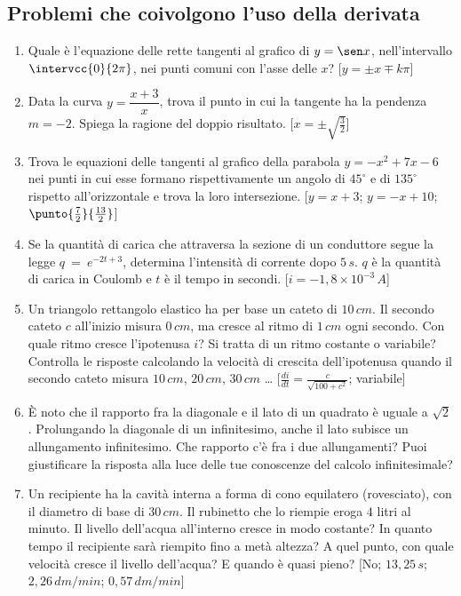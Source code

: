 \subsection{Problemi che coivolgono l'uso della derivata}
\begin{enumerate}
\item Quale è l'equazione delle rette tangenti al grafico di \(y=\sen x\), 
nell'intervallo \(\intervcc{0}{2\pi}\), nei punti comuni con l'asse delle \(x\)?
 \hfill[\(y=\pm x\mp k\pi\)]

\item Data la curva \(y=\dfrac{x+3}{x}\), trova il punto in cui la tangente ha 
la pendenza \(m=-2\). Spiega la ragione del doppio risultato.
\hfill [\(x=\pm\sqrt{\frac{3}{2}}\)]

\item  Trova le equazioni delle tangenti al grafico della parabola 
\(y=-x^2+7x-6\) nei punti in cui esse formano rispettivamente un angolo di 
\(45^\circ\) e di \(135^\circ\) rispetto all'orizzontale e trova la loro 
intersezione.
 \hfill [\(y=x+3\); \(y=-x+10\); \(\punto{\frac{7}{2}}{\frac{13}{2}}\)]

\item Se la quantità di carica che attraversa la sezione di un conduttore
segue la legge \(q~=~e^{-2t+3}\),  determina 
l'intensità di corrente dopo \(5\,s\).
\(q\) è la quantità di carica in Coulomb e \(t\) è il tempo in secondi.
\hfill [\(i=-1,8\times 10^{-3}\, A\)]

\item Un triangolo rettangolo elastico ha per base un cateto di \(10\, cm\).
Il secondo cateto \(c\) all'inizio misura \(0\, cm\), ma cresce al ritmo di 
\(1\, cm\) ogni secondo. Con quale ritmo cresce l'ipotenusa \(i\)?
Si tratta di un ritmo costante o variabile?
Controlla le risposte calcolando la velocità di crescita dell'ipotenusa quando 
il secondo cateto misura \(10\, cm\), \(20\, cm\), \(30\, cm\) \dots
\hfill [\(\frac{di}{dt}=\frac{c}{\sqrt{100+c^2}}\); variabile]

\item È noto che il rapporto fra la diagonale e il lato di un quadrato è uguale 
a \(\sqrt{2}\). Prolungando la diagonale di un infinitesimo, anche il lato 
subisce un allungamento infinitesimo. Che rapporto c'è fra i due allungamenti?
Puoi giustificare la risposta alla luce delle tue conoscenze del calcolo 
infinitesimale?

\item Un recipiente ha la cavità interna a forma di cono equilatero 
(rovesciato), con il diametro di base di \(30\, cm\). Il rubinetto che lo riempie
eroga \(4\) litri al minuto. Il livello dell'acqua all'interno cresce in modo 
costante? In quanto tempo il recipiente sarà riempito fino a metà altezza?
A quel punto, con quale velocità cresce il livello dell'acqua?
E quando è quasi pieno?
\hfill [No; \(13,25\, s\); \(2,26\, dm/min\); \(0,57\, dm/min\)]


\end{enumerate}
